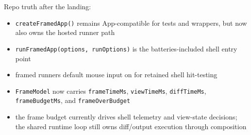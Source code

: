 Repo truth after the landing:

\begin{itemize}
\tightlist
\item
  \texttt{c\allowbreak{}r\allowbreak{}e\allowbreak{}a\allowbreak{}t\allowbreak{}e\allowbreak{}F\allowbreak{}r\allowbreak{}a\allowbreak{}m\allowbreak{}e\allowbreak{}d\allowbreak{}A\allowbreak{}p\allowbreak{}p\allowbreak{}(\allowbreak{})} remains App-compatible for tests and wrappers, but now also owns the hosted runner path
\item
  \texttt{r\allowbreak{}u\allowbreak{}n\allowbreak{}F\allowbreak{}r\allowbreak{}a\allowbreak{}m\allowbreak{}e\allowbreak{}d\allowbreak{}A\allowbreak{}p\allowbreak{}p\allowbreak{}(\allowbreak{}o\allowbreak{}p\allowbreak{}t\allowbreak{}i\allowbreak{}o\allowbreak{}n\allowbreak{}s\allowbreak{},\allowbreak{} \allowbreak{}r\allowbreak{}u\allowbreak{}n\allowbreak{}O\allowbreak{}p\allowbreak{}t\allowbreak{}i\allowbreak{}o\allowbreak{}n\allowbreak{}s\allowbreak{})} is the batteries-included shell entry point
\item
  framed runners default mouse input on for retained shell hit-testing
\item
  \texttt{F\allowbreak{}r\allowbreak{}a\allowbreak{}m\allowbreak{}e\allowbreak{}M\allowbreak{}o\allowbreak{}d\allowbreak{}e\allowbreak{}l} now carries \texttt{f\allowbreak{}r\allowbreak{}a\allowbreak{}m\allowbreak{}e\allowbreak{}T\allowbreak{}i\allowbreak{}m\allowbreak{}e\allowbreak{}M\allowbreak{}s}, \texttt{v\allowbreak{}i\allowbreak{}e\allowbreak{}w\allowbreak{}T\allowbreak{}i\allowbreak{}m\allowbreak{}e\allowbreak{}M\allowbreak{}s}, \texttt{d\allowbreak{}i\allowbreak{}f\allowbreak{}f\allowbreak{}T\allowbreak{}i\allowbreak{}m\allowbreak{}e\allowbreak{}M\allowbreak{}s}, \texttt{f\allowbreak{}r\allowbreak{}a\allowbreak{}m\allowbreak{}e\allowbreak{}B\allowbreak{}u\allowbreak{}d\allowbreak{}g\allowbreak{}e\allowbreak{}t\allowbreak{}M\allowbreak{}s}, and \texttt{f\allowbreak{}r\allowbreak{}a\allowbreak{}m\allowbreak{}e\allowbreak{}O\allowbreak{}v\allowbreak{}e\allowbreak{}r\allowbreak{}B\allowbreak{}u\allowbreak{}d\allowbreak{}g\allowbreak{}e\allowbreak{}t}
\item
  the frame budget currently drives shell telemetry and view-state decisions; the shared runtime loop still owns diff/output execution through composition
\end{itemize}

